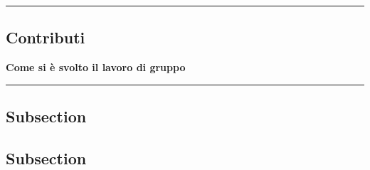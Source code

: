 {\color{gray}\hrule}
\begin{center}
\section{Contributi}
\textbf{Come si è svolto il lavoro di gruppo}
\bigskip
\end{center}
{\color{gray}\hrule}

\subsection{Subsection}
\lipsum[1]
\subsection{Subsection}
\lipsum[1-3]

\pagebreak